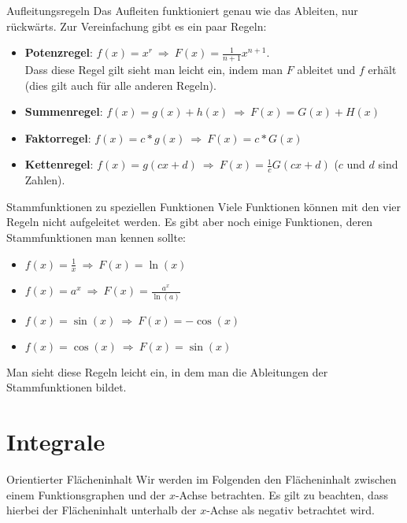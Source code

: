 \begin{bla}{Aufleitungsregeln}
  Das Aufleiten funktioniert genau wie das Ableiten, nur rückwärts. Zur Vereinfachung gibt es ein paar Regeln:
  \begin{itemize}
    \item \textbf{Potenzregel}: $f(x)=x^r\ \Rightarrow\ F(x)=\frac{1}{n+1}x^{n+1}$.\\
    Dass diese Regel gilt sieht man leicht ein, indem man $F$ ableitet und $f$ erhält (dies gilt auch für alle anderen Regeln).

    \item \textbf{Summenregel}: $f(x)=g(x)+h(x)\ \Rightarrow\ F(x)=G(x)+H(x)$

    \item \textbf{Faktorregel}: $f(x)=c*g(x)\  \Rightarrow\  F(x)=c*G(x)$

    \item \textbf{Kettenregel}: $f(x)=g(cx+d)\ \Rightarrow\ F(x)=\frac{1}{c}G(cx+d)$ ($c$ und $d$ sind Zahlen).
  \end{itemize}
\end{bla}

\clearpage
\begin{bla}{Stammfunktionen zu speziellen Funktionen}
  Viele Funktionen können mit den vier Regeln nicht aufgeleitet werden. Es gibt aber noch einige Funktionen, deren Stammfunktionen man kennen sollte:
  \begin{itemize}
    \item $f(x)=\frac{1}{x}\ \Rightarrow\  F(x)=\ln(x)$

    \item $f(x)=a^x\  \Rightarrow\  F(x)=\frac{a^x}{\ln(a)}$

    \item $f(x)=\sin(x)\  \Rightarrow\  F(x)=-\cos(x)$

    \item $f(x)=\cos(x)\  \Rightarrow\  F(x)=\sin(x)$
  \end{itemize}
  Man sieht diese Regeln leicht ein, in dem man die Ableitungen der Stammfunktionen bildet.
\end{bla}

\section{Integrale}

\begin{bla}{Orientierter Flächeninhalt}
  Wir werden im Folgenden den Flächeninhalt zwischen einem Funktionsgraphen und der $x$-Achse betrachten. Es gilt zu beachten, dass hierbei der Flächeninhalt unterhalb der $x$-Achse als negativ betrachtet wird.
\end{bla}

